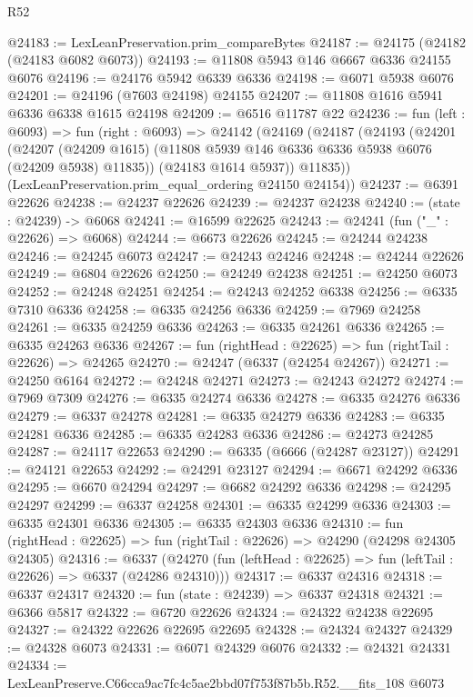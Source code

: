 \begin{lexlean}{R52}
\begin{coremodule}
@24183 := LexLeanPreservation.prim_compareBytes
@24187 := @24175 (@24182 (@24183 @6082 @6073))
@24193 := @11808 @5943 @146 @6667 @6336 @24155 @6076
@24196 := @24176 @5942 @6339 @6336
@24198 := @6071 @5938 @6076
@24201 := @24196 (@7603 @24198) @24155
@24207 := @11808 @1616 @5941 @6336 @6338 @1615 @24198
@24209 := @6516 @11787 @22
@24236 := fun (left : @6093) =>
  fun (right : @6093) =>
  @24142
    (@24169
      (@24187
        (@24193
          (@24201
            (@24207
              (@24209 @1615)
              (@11808 @5939 @146 @6336 @6336 @5938 @6076 (@24209 @5938) @11835))
            (@24183 @1614 @5937))
          @11835))
      (LexLeanPreservation.prim_equal_ordering @24150 @24154))
@24237 := @6391 @22626
@24238 := @24237 @22626
@24239 := @24237 @24238
@24240 := (state : @24239) -> @6068
@24241 := @16599 @22625
@24243 := @24241 (fun ("_" : @22626) => @6068)
@24244 := @6673 @22626
@24245 := @24244 @24238
@24246 := @24245 @6073
@24247 := @24243 @24246
@24248 := @24244 @22626
@24249 := @6804 @22626
@24250 := @24249 @24238
@24251 := @24250 @6073
@24252 := @24248 @24251
@24254 := @24243 @24252 @6338
@24256 := @6335 @7310 @6336
@24258 := @6335 @24256 @6336
@24259 := @7969 @24258
@24261 := @6335 @24259 @6336
@24263 := @6335 @24261 @6336
@24265 := @6335 @24263 @6336
@24267 := fun (rightHead : @22625) => fun (rightTail : @22626) => @24265
@24270 := @24247 (@6337 (@24254 @24267))
@24271 := @24250 @6164
@24272 := @24248 @24271
@24273 := @24243 @24272
@24274 := @7969 @7309
@24276 := @6335 @24274 @6336
@24278 := @6335 @24276 @6336
@24279 := @6337 @24278
@24281 := @6335 @24279 @6336
@24283 := @6335 @24281 @6336
@24285 := @6335 @24283 @6336
@24286 := @24273 @24285
@24287 := @24117 @22653
@24290 := @6335 (@6666 (@24287 @23127))
@24291 := @24121 @22653
@24292 := @24291 @23127
@24294 := @6671 @24292 @6336
@24295 := @6670 @24294
@24297 := @6682 @24292 @6336
@24298 := @24295 @24297
@24299 := @6337 @24258
@24301 := @6335 @24299 @6336
@24303 := @6335 @24301 @6336
@24305 := @6335 @24303 @6336
@24310 := fun (rightHead : @22625) => fun (rightTail : @22626) => @24290 (@24298 @24305 @24305)
@24316 := @6337
    (@24270 (fun (leftHead : @22625) => fun (leftTail : @22626) => @6337 (@24286 @24310)))
@24317 := @6337 @24316
@24318 := @6337 @24317
@24320 := fun (state : @24239) => @6337 @24318
@24321 := @6366 @5817
@24322 := @6720 @22626
@24324 := @24322 @24238 @22695
@24327 := @24322 @22626 @22695 @22695
@24328 := @24324 @24327
@24329 := @24328 @6073
@24331 := @6071 @24329 @6076
@24332 := @24321 @24331
@24334 := LexLeanPreserve.C66cca9ac7fc4c5ae2bbd07f753f87b5b.R52.__fits_108 @6073

\end{coremodule}
\end{lexlean}
